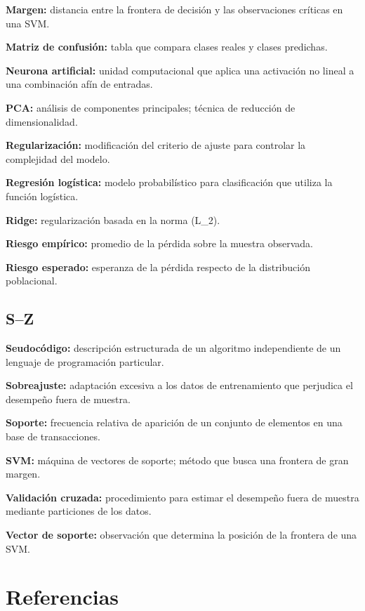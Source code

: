 \documentclass[
  spanish,
  10.5pt,
  letterpaper,
  DIV=11,
  numbers=noendperiod,
  oneside,
  open=any]{scrreprt}
\theoremstyle{definition}
\theoremstyle{definition}
\theoremstyle{plain}
\theoremstyle{remark}
\begin{document}
\textbf{Margen:} distancia entre la frontera de decisión y las
observaciones críticas en una SVM.

\textbf{Matriz de confusión:} tabla que compara clases reales y clases
predichas.

\textbf{Neurona artificial:} unidad computacional que aplica una
activación no lineal a una combinación afín de entradas.

\textbf{PCA:} análisis de componentes principales; técnica de reducción
de dimensionalidad.

\textbf{Regularización:} modificación del criterio de ajuste para
controlar la complejidad del modelo.

\textbf{Regresión logística:} modelo probabilístico para clasificación
que utiliza la función logística.

\textbf{Ridge:} regularización basada en la norma (L\_2).

\textbf{Riesgo empírico:} promedio de la pérdida sobre la muestra
observada.

\textbf{Riesgo esperado:} esperanza de la pérdida respecto de la
distribución poblacional.

\section*{S--Z}\label{sz}


\textbf{Seudocódigo:} descripción estructurada de un algoritmo
independiente de un lenguaje de programación particular.

\textbf{Sobreajuste:} adaptación excesiva a los datos de entrenamiento
que perjudica el desempeño fuera de muestra.

\textbf{Soporte:} frecuencia relativa de aparición de un conjunto de
elementos en una base de transacciones.

\textbf{SVM:} máquina de vectores de soporte; método que busca una
frontera de gran margen.

\textbf{Validación cruzada:} procedimiento para estimar el desempeño
fuera de muestra mediante particiones de los datos.

\textbf{Vector de soporte:} observación que determina la posición de la
frontera de una SVM.


\chapter*{Referencias}\label{referencias}
\end{document}
